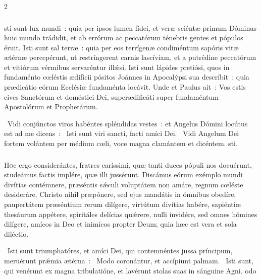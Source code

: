 \documentclass[9pt,twoside]{extarticle}
\begin{document}
\begin{multicols}{2}
{\subsubsection*{\center {}}
sti sunt lux mundi~: quia per ipsos lumen fídei, et veræ sciéntæ primum Dóminus huic mundo trádidit, et ab errórum ac peccatórum ténebris gentes et pópulos éruit. Isti sunt sal terræ~: quia per eos terrígenæ condiméntum sapóris vitæ ætérnæ percepérunt, ut restríngerent carnis lascíviam, et a putrédine peccatórum et vitiórum vérmibus servaréntur illǽsi. Isti sunt lápides pretiósi, quos in fundaménto cœléstis ædifícii pósitos Joánnes in Apocalýpsi sua descríbit~: quia prædicátio eórum Ecclésiæ fundaménta locávit. Unde et Paulus ait~: Vos estis cives Sanctórum et doméstici Dei, superædificáti super fundaméntum Apostolórum et Prophetárum.

\begin{tightlist}{}
\item {}~Vidi conjúnctos viros habéntes spléndidas vestes~: et Angelus Dómini locútus est ad me dicens~: \textred{*}~Isti sunt viri sancti, facti amíci Dei.
~Vidi Angelum Dei fortem volántem per médium cœli, voce magna clamántem et dicéntem. sti.
\end{tightlist}

\subsubsection*{\center {}}
\lettrine{H}oc ergo considerántes, fratres caríssimi, quæ tanti duces pópuli nos docuérunt, studeámus factis implére, quæ illi jussérunt. Discámus eórum exémplo mundi divítias contémnere, præséntis sǽculi voluptátem non amáre, regnum cœléste desideráre, Christo nihil præpónere, sed ejus mandátis in ómnibus obedíre, paupertátem præséntium rerum dilígere, virtútum divítias habére, sapiéntiæ thesáurum appétere, spiritáles delícias quǽrere, nulli invidére, sed omnes hómines dilígere, amícos in Deo et inimícos propter Deum; quia hæc est vera et sola diléctio.

\begin{tightlist}{}
\item {}~Isti sunt triumphatóres, et amíci Dei, qui contemnéntes jussa príncipum, meruérunt prǽmia ætérna~: \textred{*}~Modo coronántur, et accípiunt palmam.
~Isti sunt, qui venérunt ex magna tribulatióne, et lavérunt stolas suas in sánguine Agni. odo
\end{tightlist}

}
\end{multicols}
\end{document}
